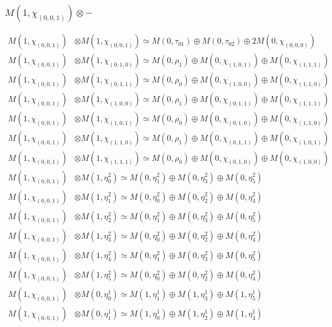 \subsubsection{$ M(1,\chi_{(0,0,1)})\otimes -$}
\begin{align*}
M(1,\chi_{(0,0,1)}) &\otimes M(1,\chi_{(0,0,1)}) \simeq M(0,\tau_{01}) \oplus M(0,\tau_{02}) \oplus 2 M(0,\chi_{(0,0,0)}) \\
M(1,\chi_{(0,0,1)}) &\otimes M(1,\chi_{(0,1,0)}) \simeq M(0,\rho_{1}) \oplus M(0,\chi_{(1,0,1)}) \oplus M(0,\chi_{(1,1,1)}) \\
M(1,\chi_{(0,0,1)}) &\otimes M(1,\chi_{(0,1,1)}) \simeq M(0,\rho_{0}) \oplus M(0,\chi_{(1,0,0)}) \oplus M(0,\chi_{(1,1,0)}) \\
M(1,\chi_{(0,0,1)}) &\otimes M(1,\chi_{(1,0,0)}) \simeq M(0,\rho_{1}) \oplus M(0,\chi_{(0,1,1)}) \oplus M(0,\chi_{(1,1,1)}) \\
M(1,\chi_{(0,0,1)}) &\otimes M(1,\chi_{(1,0,1)}) \simeq M(0,\rho_{0}) \oplus M(0,\chi_{(0,1,0)}) \oplus M(0,\chi_{(1,1,0)}) \\
M(1,\chi_{(0,0,1)}) &\otimes M(1,\chi_{(1,1,0)}) \simeq M(0,\rho_{1}) \oplus M(0,\chi_{(0,1,1)}) \oplus M(0,\chi_{(1,0,1)}) \\
M(1,\chi_{(0,0,1)}) &\otimes M(1,\chi_{(1,1,1)}) \simeq M(0,\rho_{0}) \oplus M(0,\chi_{(0,1,0)}) \oplus M(0,\chi_{(1,0,0)}) \\
M(1,\chi_{(0,0,1)}) &\otimes M(1,\eta^{2}_{0}) \simeq M(0,\eta^{2}_{1}) \oplus M(0,\eta^{2}_{3}) \oplus M(0,\eta^{2}_{5}) \\
M(1,\chi_{(0,0,1)}) &\otimes M(1,\eta^{2}_{1}) \simeq M(0,\eta^{2}_{0}) \oplus M(0,\eta^{2}_{2}) \oplus M(0,\eta^{2}_{4}) \\
M(1,\chi_{(0,0,1)}) &\otimes M(1,\eta^{2}_{2}) \simeq M(0,\eta^{2}_{1}) \oplus M(0,\eta^{2}_{3}) \oplus M(0,\eta^{2}_{5}) \\
M(1,\chi_{(0,0,1)}) &\otimes M(1,\eta^{2}_{3}) \simeq M(0,\eta^{2}_{0}) \oplus M(0,\eta^{2}_{2}) \oplus M(0,\eta^{2}_{4}) \\
M(1,\chi_{(0,0,1)}) &\otimes M(1,\eta^{2}_{4}) \simeq M(0,\eta^{2}_{1}) \oplus M(0,\eta^{2}_{3}) \oplus M(0,\eta^{2}_{5}) \\
M(1,\chi_{(0,0,1)}) &\otimes M(1,\eta^{2}_{5}) \simeq M(0,\eta^{2}_{0}) \oplus M(0,\eta^{2}_{2}) \oplus M(0,\eta^{2}_{4}) \\
M(1,\chi_{(0,0,1)}) &\otimes M(0,\eta^{1}_{0}) \simeq M(1,\eta^{1}_{1}) \oplus M(1,\eta^{1}_{3}) \oplus M(1,\eta^{1}_{5}) \\
M(1,\chi_{(0,0,1)}) &\otimes M(0,\eta^{1}_{1}) \simeq M(1,\eta^{1}_{0}) \oplus M(1,\eta^{1}_{2}) \oplus M(1,\eta^{1}_{4}) \\

\end{align*}

